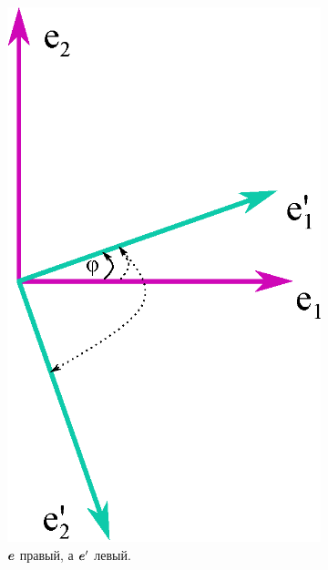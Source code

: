 \documentclass[a4paper,12pt]{article}
\begin{document}
  \begin{figure}
    \centering
    
    \begin{subfigure}[b]{0.3\columnwidth}
      \centering
      \includegraphics[width=\textwidth]{turned-ortonorm-basis2_left2}
      \caption{$\boldsymbol e$ правый, а $\boldsymbol e'$ левый.}
    \end{subfigure}
    \hspace{5em}
    \begin{subfigure}[b]{0.4\columnwidth}
      \centering

\end{subfigure}
\end{figure}
\end{document}
